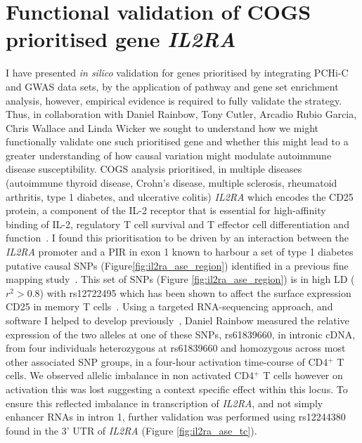 \documentclass[a4paper,11pt]{report}
\begin{document}
\section{Functional validation of COGS prioritised gene \textit{IL2RA}}
\label{section:il2ra}
I have presented \textit{in silico} validation for genes prioritised by integrating PCHi-C and GWAS data sets, by the application of pathway and gene set enrichment analysis, however, empirical evidence is required to fully validate the strategy. Thus, in collaboration with Daniel Rainbow, Tony Cutler, Arcadio Rubio Garcia, Chris Wallace and Linda Wicker we sought to understand how we might functionally validate one such prioritised gene and whether this might lead to a greater understanding of how causal variation might modulate autoimmune disease susceptibility. COGS analysis prioritised, in multiple diseases (autoimmune thyroid disease, Crohn's disease, multiple sclerosis, rheumatoid arthritis, type 1 diabetes, and ulcerative colitis) \textit{IL2RA} which encodes the CD25 protein,  a component of the IL-2 receptor that is essential for high-affinity binding of IL-2, regulatory T cell survival and T effector cell differentiation and function~\citep{LiaoLinLeonard2013}. I found this prioritisation to be driven by an interaction between the \textit{IL2RA} promoter and a PIR in exon 1 known to harbour a set of type 1 diabetes putative causal SNPs (Figure\ref{fig:il2ra_ase_region}) identified in a previous fine mapping study~\citep{WallaceCutlerPontikosEtAl2015}. This  set of SNPs (Figure \ref{fig:il2ra_ase_region}) is in high LD ($r^{2} > 0.8$) with rs12722495 which has been shown to affect the surface expression CD25 in memory T cells~\citep{DendrouPlagnolFungEtAl2009}. Using a targeted RNA-sequencing approach, and software I helped to develop previously~\citep{RainbowYangBurrenEtAl2015}, Daniel Rainbow measured the relative expression of the two alleles at one of these SNPs, rs61839660, in intronic cDNA, from four individuals heterozygous at rs61839660 and homozygous across most other associated SNP groups, in a four-hour activation time-course of CD4$^{+}$ T cells. We observed allelic imbalance in non activated CD4$^{+}$ T cells however on activation this was lost suggesting a context specific effect within this locus. To ensure this reflected imbalance in transcription of \textit{IL2RA}, and not simply enhancer RNAs in intron 1,  further validation was performed using rs12244380 found in the 3' UTR of \textit{IL2RA} (Figure \ref{fig:il2ra_ase_tc}). 
\end{document}
